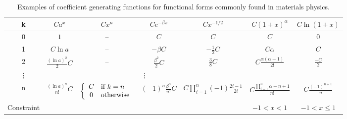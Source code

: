 \begin{sidewaystable}[htp]
\caption{Examples of coefficient generating functions for functional forms commonly found in materials physics.}
\begin{center}
\begin{tabular}{c | c c c c c c}
	k	& %
		$C a^x$	& %
			$C x^n$	& %
				$Ce^{-\beta x}$	& %
					$C x^{-1/2}$ & %
                        $C (1 + x)^\alpha$ & %
                            $C \ln(1 + x)$ \\[2ex]
	\hline
	0	& %
		$1$	& %
			--	& %
				$C$	& %
					$C$ & %
                        $C$ & %
                            $0$ \\[2ex]
	1	& %
		$C \ln a$	& %
			--	& %
				$-\beta C$		& %
					$-\frac{1}{2}C$ & %
                        $C\alpha$ & %
                            $C$ \\[2ex]
	2	& %
		$\frac{(\ln a)^2}{2} C$	& %
			--	&  %
				$\frac{\beta^2}{2} C$	& %
					$\frac{3}{8}C$	& %
                        $C\frac{\alpha (\alpha - 1)}{2!}$ & %
                            $\frac{-C}{2}$ \\[2ex]
	\vdots & \multicolumn{4}{c}{\vdots} \\[2ex]
	n	& %
		$\frac{(\ln a)^n}{n!} C$	& %
			$\left\{\begin{array}{c l}
				C & \text{if}\ k = n \\
				0 & \text{otherwise}
			  \end{array}\right.$	& %
				$(-1)^n\frac{\beta^n}{n!} C$	& %
					$C \prod_{i=1}^n (-1)\frac{2i - 1}{2i}$ & %
                        $C \frac{\prod_{i=1}^n \alpha - n + 1}{n!}$ & %
                            $C\frac{(-1)^{n+1}}{n}$ \\[2ex]
	\hline
    Constraint & %
        & %
            & %
                & %
                    & %
                        $-1 < x < 1$ & %
                            $-1 < x \le 1$ \\
    \hline
\end{tabular}
\end{center}
\label{tab:generating functions of common functions}
\end{sidewaystable}
